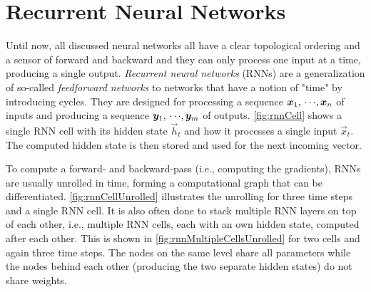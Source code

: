\chapter{Recurrent Neural Networks}
	Until now, all discussed neural networks all have a clear topological ordering and a sensor of forward and backward and they can only process one input at a time, producing a single output. \emph{Recurrent neural networks} (RNNs) are a generalization of so-called \emph{feedforward networks} to networks that have a notion of "time" by introducing cycles. They are designed for processing a sequence \( \bm{x}_1,\,\cdots\!,\bm{x}_n \) of inputs and producing a sequence \( \bm{y}_1,\,\cdots\!,\bm{y}_m \) of outputs. \autoref{fig:rnnCell} shows a single RNN cell with its hidden state \(\vec{h}_t\) and how it processes a single input \(\vec{x}_t\). The computed hidden state is then stored and used for the next incoming vector.

	To compute a forward- and backward-pass (i.e., computing the gradients), RNNs are usually unrolled in time, forming a computational graph that can be differentiated. \autoref{fig:rnnCellUnrolled} illustrates the unrolling for three time steps and a single RNN cell. It is also often done to stack multiple RNN layers on top of each other, i.e., multiple RNN cells, each with an own hidden state, computed after each other. This is shown in \autoref{fig:rnnMultipleCellsUnrolled} for two cells and again three time steps. The nodes on the same level share all parameters while the nodes behind each other (producing the two separate hidden states) do not share weights.

